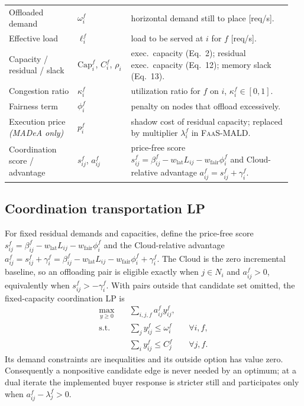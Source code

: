 \begin{table}[t]
\begin{tabular}{@{}p{0.23\linewidth} p{0.18\linewidth} p{0.54\linewidth}@{}}
Offloaded demand & $\omega_i^f$ & horizontal demand still to place [req/s].\\
Effective load & $\ell_i^f$ & load to be served at $i$ for $f$ [req/s].\\
Capacity / residual / slack & $\mathrm{Cap}_i^f$, $C_i^f$, $\rho_i$ & exec.\ capacity (Eq.~2); residual exec.\ capacity (Eq.~12); memory slack (Eq.~13).\\
Congestion ratio & $\kappa_i^f$ & utilization ratio for $f$ on $i$, $\kappa_i^f\in[0,1]$.\\
Fairness term & $\phi_i^f$ & penalty on nodes that offload excessively.\\
Execution price \emph{(MADeA only)} & $p_i^f$ & shadow cost of residual capacity; replaced by multiplier $\lambda_i^f$ in \textsc{FaaS-MALD}.\\
Coordination score / advantage & $s_{ij}^f$, $a_{ij}^f$ & price-free score $s_{ij}^f=\beta_{ij}^f-w_{\mathrm{lat}}L_{ij}-w_{\mathrm{fair}}\phi_i^f$ and Cloud-relative advantage $a_{ij}^f=s_{ij}^f+\gamma_i^f$.\\
\bottomrule
\end{tabular}
\end{table}

\subsection{Coordination transportation LP}
For fixed residual demands and capacities, define the price-free score
\(
  s_{ij}^f=\beta_{ij}^f-w_{\mathrm{lat}}L_{ij}-w_{\mathrm{fair}}\phi_i^f
\)
and the Cloud-relative advantage
\(
  a_{ij}^f=s_{ij}^f+\gamma_i^f
  =\beta_{ij}^f-w_{\mathrm{lat}}L_{ij}-w_{\mathrm{fair}}\phi_i^f+\gamma_i^f
\).
The Cloud is the zero incremental baseline, so an offloading pair is eligible
exactly when $j\in N_i$ and $a_{ij}^f>0$, equivalently when $s_{ij}^f>-\gamma_i^f$.
With pairs outside that candidate set omitted, the fixed-capacity
coordination LP is
\begin{align}
 \max_{y\geq0}\quad&\sum_{i,j,f}a_{ij}^fy_{ij}^f,\\
 \text{s.t.}\quad&\sum_jy_{ij}^f\leq\omega_i^f &&\forall i,f,\\
 &\sum_iy_{ij}^f\leq C_j^f &&\forall j,f.
\end{align}
Its demand constraints are inequalities and its outside option has value zero.
Consequently a nonpositive candidate edge is never needed by an optimum; at a
dual iterate the implemented buyer response is stricter still and participates
only when $a_{ij}^f-\lambda_j^f>0$.

